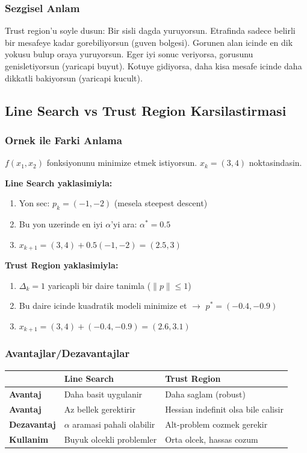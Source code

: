 \documentclass[12pt,a4paper]{article}
\theoremstyle{definition}
\theoremstyle{remark}
\begin{document}
\subsubsection{Sezgisel Anlam}

Trust region'u soyle dusun: Bir sisli dagda yuruyorsun. Etrafinda sadece belirli bir mesafeye kadar gorebiliyorsun (guven bolgesi). Gorunen alan icinde en dik yokusu bulup oraya yuruyorsun. Eger iyi sonuc veriyorsa, gorusunu genisletiyorsun (yaricapi buyut). Kotuye gidiyorsa, daha kisa mesafe icinde daha dikkatli bakiyorsun (yaricapi kucult).

\subsection{Line Search vs Trust Region Karsilastirmasi}

\subsubsection{Ornek ile Farki Anlama}

$f(x_1, x_2)$ fonksiyonunu minimize etmek istiyorsun. $x_k = (3, 4)$ noktasindasin.

\textbf{Line Search yaklasimiyla:}
\begin{enumerate}[leftmargin=*, itemsep=0.2em]
\item Yon sec: $p_k = (-1, -2)$ (mesela steepest descent)
\item Bu yon uzerinde en iyi $\alpha$'yi ara: $\alpha^* = 0.5$
\item $x_{k+1} = (3, 4) + 0.5(-1, -2) = (2.5, 3)$
\end{enumerate}

\textbf{Trust Region yaklasimiyla:}
\begin{enumerate}[leftmargin=*, itemsep=0.2em]
\item $\Delta_k = 1$ yaricapli bir daire tanimla ($\|p\| \leq 1$)
\item Bu daire icinde kuadratik modeli minimize et $\rightarrow$ $p^* = (-0.4, -0.9)$
\item $x_{k+1} = (3, 4) + (-0.4, -0.9) = (2.6, 3.1)$
\end{enumerate}

\subsubsection{Avantajlar/Dezavantajlar}

\begin{center}
\begin{tabular}{@{}lll@{}}
\toprule
 & \textbf{Line Search} & \textbf{Trust Region} \\
\midrule
\textbf{Avantaj} & Daha basit uygulanir & Daha saglam (robust) \\
\textbf{Avantaj} & Az bellek gerektirir & Hessian indefinit olsa bile calisir \\
\textbf{Dezavantaj} & $\alpha$ aramasi pahali olabilir & Alt-problem cozmek gerekir \\
\textbf{Kullanim} & Buyuk olcekli problemler & Orta olcek, hassas cozum \\
\bottomrule
\end{tabular}
\end{center}
\end{document}
